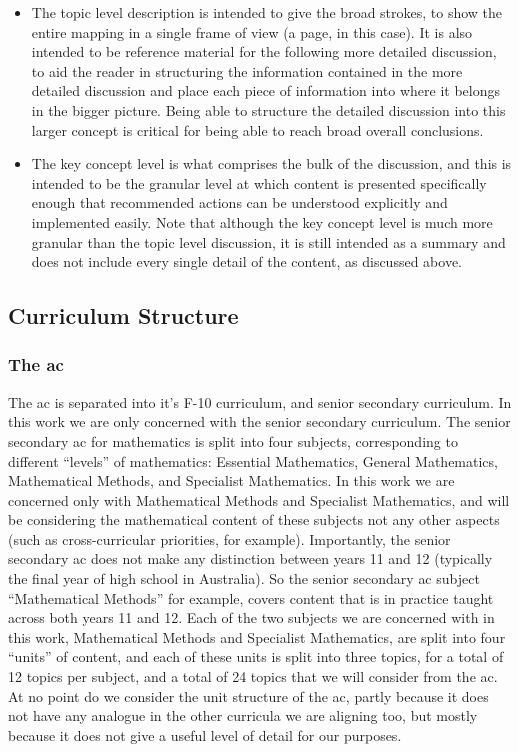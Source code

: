 \documentclass[twoside,12pt,a4paper]{report}
\begin{document}
\begin{itemize}
	\item The topic level description is intended to give the broad strokes, to show the entire mapping in a single frame of view (a page, in this case). It is also intended to be reference material for the following more detailed discussion, to aid the reader in structuring the information contained in the more detailed discussion and place each piece of information into where it belongs in the bigger picture. Being able to structure the detailed discussion into this larger concept is critical for being able to reach broad overall conclusions.
	\item The key concept level is what comprises the bulk of the discussion, and this is intended to be the granular level at which content is presented specifically enough that recommended actions can be understood explicitly and implemented easily. Note that although the key concept level is much more granular than the topic level discussion, it is still intended as a summary and does not include every single detail of the content, as discussed above.
\end{itemize}



\subsection{Curriculum Structure}
\label{sec:structure}

\subsubsection{The \gls{ac}}

The \gls{ac} is separated into it's F-10 curriculum, and senior secondary curriculum. In this work we are only concerned with the senior secondary curriculum. The senior secondary \gls{ac} for mathematics is split into four subjects, corresponding to different ``levels'' of mathematics: Essential Mathematics, General Mathematics, Mathematical Methods, and Specialist Mathematics. In this work we are concerned only with Mathematical Methods and Specialist Mathematics, and will be considering the mathematical content of these subjects not any other aspects (such as cross-curricular priorities, for example). Importantly, the senior secondary \gls{ac} does not make any distinction between years 11 and 12 (typically the final year of high school in Australia). So the senior secondary \gls{ac} subject ``Mathematical Methods'' for example, covers content that is in practice taught across both years 11 and 12. Each of the two subjects we are concerned with in this work, Mathematical Methods and Specialist Mathematics, are split into four ``units'' of content, and each of these units is split into three topics, for a total of 12 topics per subject, and a total of 24 topics that we will consider from the \gls{ac}. At no point do we consider the unit structure of the \gls{ac}, partly because it does not have any analogue in the other curricula we are aligning too, but mostly because it does not give a useful level of detail for our purposes.
\end{document}

